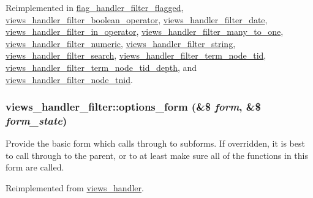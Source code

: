 Reimplemented in \hyperlink{classflag__handler__filter__flagged_c840d3d9514263a5645c551c15e1daf2}{flag\_\-handler\_\-filter\_\-flagged}, \hyperlink{classviews__handler__filter__boolean__operator_f2103bf9a481a2a2eb4d5c0e6baf2b77}{views\_\-handler\_\-filter\_\-boolean\_\-operator}, \hyperlink{classviews__handler__filter__date_5fdeb678009a8c8c23395826caee3062}{views\_\-handler\_\-filter\_\-date}, \hyperlink{classviews__handler__filter__in__operator_76892fbc2f6206e88d83925e187c4ab7}{views\_\-handler\_\-filter\_\-in\_\-operator}, \hyperlink{classviews__handler__filter__many__to__one_e72e4f1ca6a64f22737671275d8d7a92}{views\_\-handler\_\-filter\_\-many\_\-to\_\-one}, \hyperlink{classviews__handler__filter__numeric_a6c2de73a4c7eda8575e1691b8218b3b}{views\_\-handler\_\-filter\_\-numeric}, \hyperlink{classviews__handler__filter__string_12b7ca0453039900efde58e2c14bf0c8}{views\_\-handler\_\-filter\_\-string}, \hyperlink{classviews__handler__filter__search_f41b61b9dc7a676fbe0110c1d7ffcfdb}{views\_\-handler\_\-filter\_\-search}, \hyperlink{classviews__handler__filter__term__node__tid_e81fb582295a2c8871b32bbf8b3ea915}{views\_\-handler\_\-filter\_\-term\_\-node\_\-tid}, \hyperlink{classviews__handler__filter__term__node__tid__depth_e0822209bc155abaec93555bbeb93e78}{views\_\-handler\_\-filter\_\-term\_\-node\_\-tid\_\-depth}, and \hyperlink{classviews__handler__filter__node__tnid_ab1f73e93ba261fff47a93a698612e25}{views\_\-handler\_\-filter\_\-node\_\-tnid}.\hypertarget{classviews__handler__filter_f14c69367162057a32709a6340de0988}{
\subsubsection[{options\_\-form}]{\setlength{\rightskip}{0pt plus 5cm}views\_\-handler\_\-filter::options\_\-form (\&\$ {\em form}, \/  \&\$ {\em form\_\-state})}}
\label{classviews__handler__filter_f14c69367162057a32709a6340de0988}


Provide the basic form which calls through to subforms. If overridden, it is best to call through to the parent, or to at least make sure all of the functions in this form are called. 

Reimplemented from \hyperlink{classviews__handler_a41fcf16b177eb03e35facbae6320f74}{views\_\-handler}.

